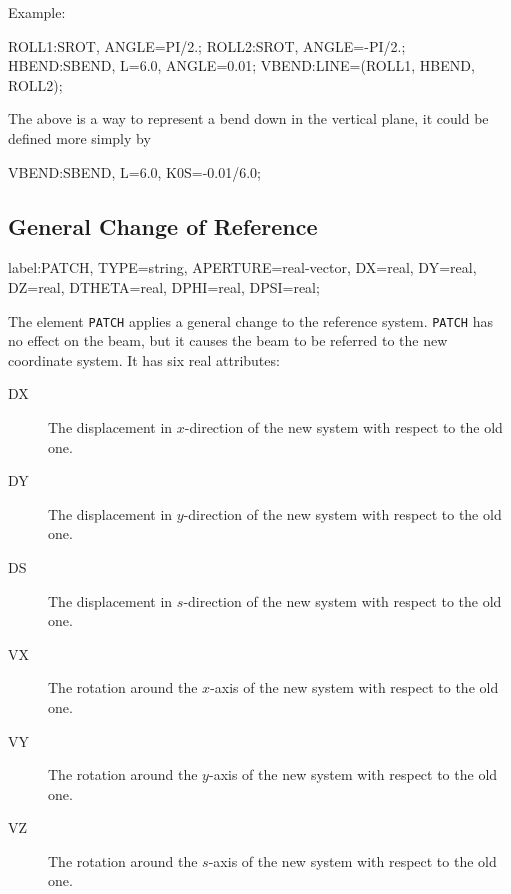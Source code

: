 \noindent Example:
\begin{example}
ROLL1:SROT, ANGLE=PI/2.;
ROLL2:SROT, ANGLE=-PI/2.;
HBEND:SBEND, L=6.0, ANGLE=0.01;
VBEND:LINE=(ROLL1, HBEND, ROLL2);
\end{example}
The above is a way to represent a bend down in the vertical plane,
it could be defined more simply by
\begin{example}
VBEND:SBEND, L=6.0, K0S=-0.01/6.0;
\end{example}

\subsection{General Change of Reference}
\label{sec:patch}
\begin{example}
label:PATCH, TYPE=string, APERTURE=real-vector,
      DX=real, DY=real, DZ=real, DTHETA=real,
      DPHI=real, DPSI=real;
\end{example}
The element \texttt{PATCH} applies a general change to the reference system.
\texttt{PATCH} has no effect on the beam,
but it causes the beam to be referred to the new coordinate system.
It has six real attributes:
\begin{description}
\item[DX]
  The displacement in $x$-direction of the new system with respect to the old
  one.
\item[DY]
  The displacement in $y$-direction of the new system with respect to the old
  one.
\item[DS]
  The displacement in $s$-direction of the new system with respect to the old
  one.
\item[VX]
  The rotation around the $x$-axis of the new system with respect to the old
  one.
\item[VY]
  The rotation around the $y$-axis of the new system with respect to the old
  one.
\item[VZ]
  The rotation around the $s$-axis of the new system with respect to the old
  one.
\end{description}

